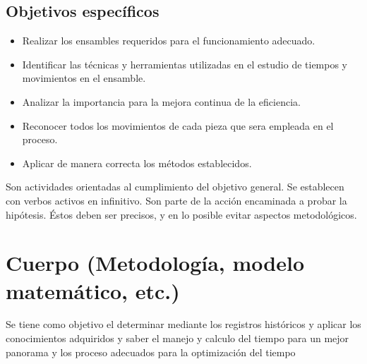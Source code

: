     
    \subsection{Objetivos específicos }
    
    \begin{itemize}
        \item Realizar los ensambles requeridos para el funcionamiento adecuado.
        \item Identificar las técnicas y herramientas utilizadas en el estudio de tiempos y movimientos en el ensamble.
        \item Analizar la importancia  para la mejora continua de la eficiencia.
        \item Reconocer todos los movimientos de cada pieza que sera empleada en el proceso.
        \item Aplicar de manera correcta los métodos establecidos.
    \end{itemize}
    
    Son actividades orientadas al cumplimiento del objetivo general. Se establecen con verbos activos en infinitivo. Son parte de la acción encaminada a probar la hipótesis. Éstos deben ser precisos, y en lo posible evitar aspectos metodológicos.
    \section{Cuerpo (Metodología, modelo matemático, etc.)}
    
    Se tiene como objetivo el determinar mediante los registros históricos y aplicar los conocimientos adquiridos y saber el manejo y calculo del tiempo para un mejor panorama  y los proceso adecuados para la optimización del tiempo
    
